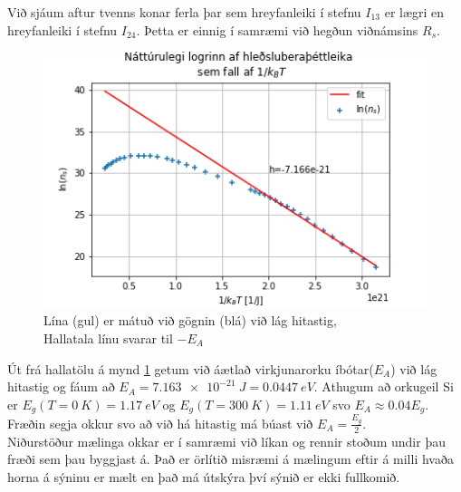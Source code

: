 \documentclass[11pt]{article}
\begin{document}
Við sjáum aftur tvenns konar ferla þar sem hreyfanleiki í stefnu $I_{13}$ er lægri en hreyfanleiki í stefnu $I_{24}$. Þetta er einnig í samræmi við hegðun viðnámsins $R_s$.

\begin{figure}[H]
    \centering
    \includegraphics{nl(n_s).PNG}
    \caption{Lína (gul) er mátuð við gögnin (blá) við lág hitastig,\\ Hallatala línu svarar til $-E_A$}
    \label{fig:ln(n_s)}
\end{figure}

Út frá hallatölu á mynd \ref{fig:ln(n_s)} getum við áætlað virkjunarorku íbótar($E_A$) við lág hitastig og fáum að $E_A = \SI{7.163e-21}{J} = \SI{0.0447}{eV}$. Athugum að orkugeil Si er $E_{g}(T=\SI{0}{K}) = \SI{1.17}{eV}$ og $E_{g}(T=\SI{300}{K}) = \SI{1.11}{eV}$ svo $E_A\approx0.04E_{g}$. Fræðin segja okkur svo að við há hitastig má búast við $E_A = \frac{E_g}{2}$.\\


Niðurstöður mælinga okkar er í samræmi við líkan og rennir stoðum undir þau fræði sem þau byggjast á. Það er örlítið misræmi á mælingum eftir á milli hvaða horna á sýninu er mælt en það má útskýra því sýnið er ekki fullkomið. 
\end{document}
